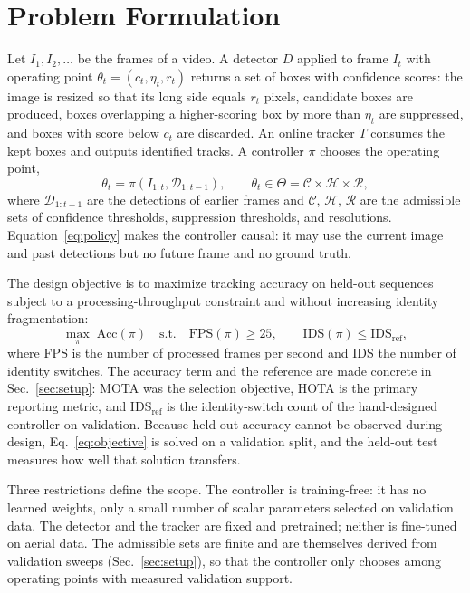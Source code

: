 \documentclass[journal]{new-aiaa}
\begin{document}
\section{Problem Formulation}\label{sec:problem}
Let $I_1, I_2, \ldots$ be the frames of a video. A detector $D$ applied to frame $I_t$ with operating point $\theta_t=(c_t,\eta_t,r_t)$ returns a set of boxes with confidence scores: the image is resized so that its long side equals $r_t$ pixels, candidate boxes are produced, boxes overlapping a higher-scoring box by more than $\eta_t$ are suppressed, and boxes with score below $c_t$ are discarded. An online tracker $T$ consumes the kept boxes and outputs identified tracks. A controller $\pi$ chooses the operating point,
\begin{equation}
\theta_t = \pi\left(I_{1:t}, \mathcal{D}_{1:t-1}\right), \qquad \theta_t \in \Theta = \mathcal{C} \times \mathcal{H} \times \mathcal{R},
\label{eq:policy}
\end{equation}
where $\mathcal{D}_{1:t-1}$ are the detections of earlier frames and $\mathcal{C}$, $\mathcal{H}$, $\mathcal{R}$ are the admissible sets of confidence thresholds, suppression thresholds, and resolutions. Equation~\eqref{eq:policy} makes the controller causal: it may use the current image and past detections but no future frame and no ground truth.

The design objective is to maximize tracking accuracy on held-out sequences subject to a processing-throughput constraint and without increasing identity fragmentation:
\begin{equation}
\max_{\pi}\; \mathrm{Acc}(\pi) \quad \text{s.t.} \quad \mathrm{FPS}(\pi) \ge 25, \qquad \mathrm{IDS}(\pi) \le \mathrm{IDS}_{\mathrm{ref}},
\label{eq:objective}
\end{equation}
where FPS is the number of processed frames per second and IDS the number of identity switches. The accuracy term and the reference are made concrete in Sec.~\ref{sec:setup}: MOTA was the selection objective, HOTA is the primary reporting metric, and $\mathrm{IDS}_{\mathrm{ref}}$ is the identity-switch count of the hand-designed controller on validation. Because held-out accuracy cannot be observed during design, Eq.~\eqref{eq:objective} is solved on a validation split, and the held-out test measures how well that solution transfers.

Three restrictions define the scope. The controller is training-free: it has no learned weights, only a small number of scalar parameters selected on validation data. The detector and the tracker are fixed and pretrained; neither is fine-tuned on aerial data. The admissible sets are finite and are themselves derived from validation sweeps (Sec.~\ref{sec:setup}), so that the controller only chooses among operating points with measured validation support.
\end{document}
